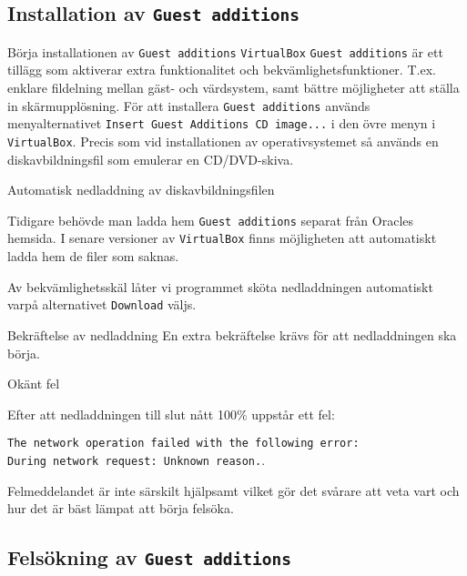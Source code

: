 \subsection{Installation av \texttt{Guest additions}}

           {Börja installationen av \texttt{Guest additions}}
           {\texttt{VirtualBox} \texttt{Guest additions} är ett tillägg som
            aktiverar extra funktionalitet och bekvämlighetsfunktioner. T.ex.
            enklare fildelning mellan gäst- och värdsystem, samt bättre
            möjligheter att ställa in skärmupplösning. För att installera
            \texttt{Guest additions} används menyalternativet
            \texttt{Insert Guest Additions CD image...} i den övre menyn i
            \texttt{VirtualBox}. Precis som vid installationen av operativsystemet
            så används en diskavbildningsfil som emulerar en CD/DVD-skiva.}
           {}

           {Automatisk nedladdning av diskavbildningsfilen}
           {Tidigare behövde man ladda hem \texttt{Guest additions} separat från
            Oracles hemsida. I senare versioner av \texttt{VirtualBox} finns
            möjligheten att automatiskt ladda hem de filer som saknas.
            \par Av bekvämlighetsskäl låter vi programmet sköta nedladdningen
            automatiskt varpå alternativet \texttt{Download} väljs.}
           {}

           {Bekräftelse av nedladdning}
           {En extra bekräftelse krävs för att nedladdningen ska börja.}
           {}

           {Okänt fel}
           {Efter att nedladdningen till slut nått 100\% uppstår ett fel:
            \par \texttt{The network operation failed with the following error:
            \\ During network request: Unknown reason.}.
            \par Felmeddelandet är inte särskilt hjälpsamt vilket gör det
            svårare att veta vart och hur det är bäst lämpat att börja felsöka.}
           {}


\subsection{Felsökning av \texttt{Guest additions}}

